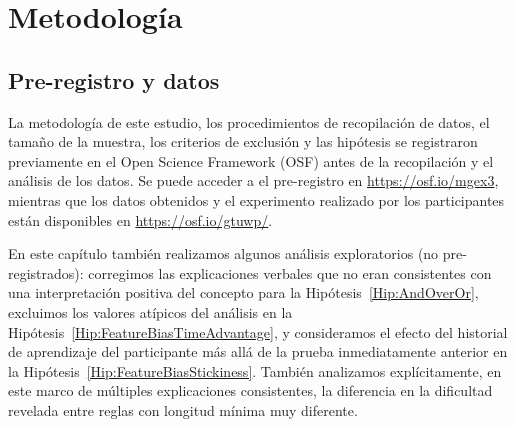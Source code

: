 \section{Metodología}\label{Sec:AdditionalMethodology}


\subsection{Pre-registro y datos}

La metodología de este estudio, los procedimientos de recopilación de datos, el tamaño de la muestra, los criterios de exclusión y las hipótesis se registraron previamente en el Open Science Framework (OSF) antes de la recopilación y el análisis de los datos. Se puede acceder a el pre-registro en \url{https://osf.io/mgex3}, mientras que los datos obtenidos y el experimento realizado por los participantes están disponibles en \url{https://osf.io/gtuwp/}.

En este capítulo también realizamos algunos análisis exploratorios (no pre-registrados): corregimos las explicaciones verbales que no eran consistentes con una interpretación positiva del concepto para la Hipótesis~\ref{Hip:AndOverOr}, excluimos los valores atípicos del análisis en la Hipótesis~\ref{Hip:FeatureBiasTimeAdvantage}, y consideramos el efecto del historial de aprendizaje del participante más allá de la prueba inmediatamente anterior en la Hipótesis~\ref{Hip:FeatureBiasStickiness}. También analizamos explícitamente, en este marco de múltiples explicaciones consistentes, la diferencia en la dificultad revelada entre reglas con longitud mínima muy diferente.

